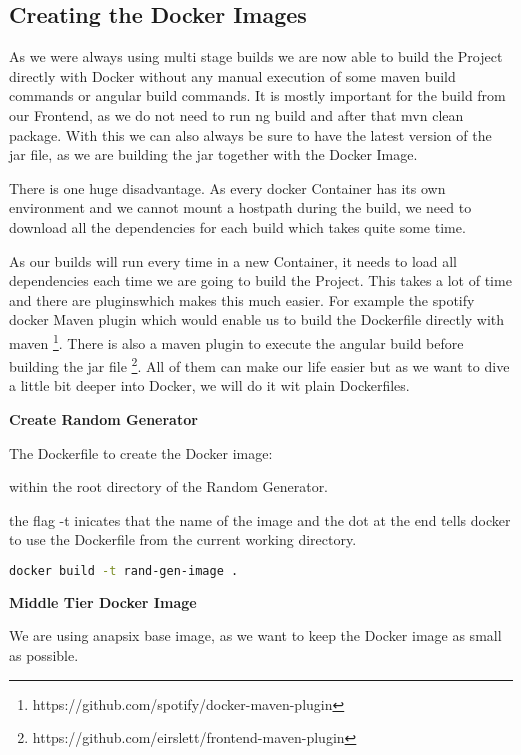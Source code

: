 \subsection{Creating the Docker Images}
As we were always using multi stage builds we are now able to build the Project directly with Docker without any manual execution of some maven build commands or angular build commands.
It is mostly important for the build from our Frontend, as we do not need to run ng build and after that mvn clean package.
With this we can also always be sure to have the latest version of the jar file, as we are building the jar together with the Docker Image.

There is one huge disadvantage. As every docker Container has its own environment and we cannot mount a hostpath during the build, we need to download all the dependencies for each build which takes quite some time.

As our builds will run every time in a new Container, it needs to load all dependencies each time we are going to build the Project. This takes a lot of time and there are pluginswhich makes this much easier.
For example the spotify docker Maven plugin which would enable us to build the Dockerfile directly with maven \footnote{https://github.com/spotify/docker-maven-plugin}.
There is also a maven plugin to execute the angular build before building the jar file \footnote{https://github.com/eirslett/frontend-maven-plugin}.
All of them can make our life easier but as we want to dive a little bit deeper into Docker, we will do it wit plain Dockerfiles.

\textbf{Create Random Generator}

The Dockerfile to create the Docker image:


within the root directory of the Random Generator.

the flag -t inicates that the name of the image and the dot at the end tells docker to use the Dockerfile from the current working directory.

\begin{lstlisting}[language=Bash]
docker build -t rand-gen-image .
\end{lstlisting}

\textbf{Middle Tier Docker Image}


We are using anapsix base image, as we want to keep the Docker image as small as possible.

